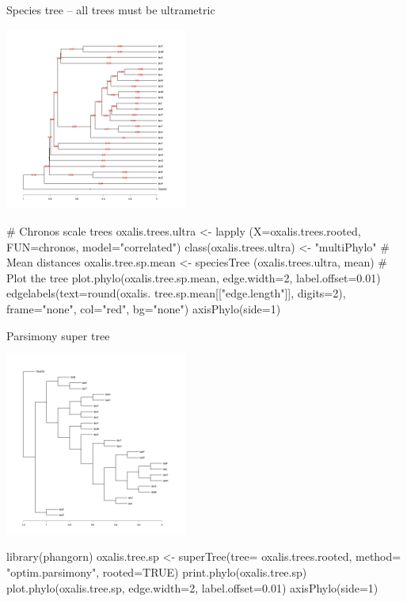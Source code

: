 \documentclass[compress, ucs, xelatex, 11pt, xcolor=svgnames,
  hyperref={
    bookmarks=true,
    unicode=true,
    colorlinks=true,
    pdftitle={Molecular data in R},
    plainpages=false,
    pdfauthor={Vojtech Zeisek},
    pdfsubject={Course about phylogeny and evolution in R},
    pdfcreator={XeLaTeX},
    pdfkeywords={R, evolution, phylogeny, molecular data},
    linkcolor=Tomato,
    anchorcolor=SaddleBrown,
    citecolor=Goldenrod,
    filecolor=DarkMagenta,
    menucolor=Sienna,
    urlcolor=DarkTurquoise,
    pdftex},
  url={hyphens, lowtilde} %
  ]{beamer}
\begin{document}
\begin{frame}[fragile]{Species tree -- all trees must be ultrametric}
\begin{multicols}{2}
\includegraphics[height=6cm]{oxalis-sp.png}
  \columnbreak
  \begin{spluscode}
    # Chronos scale trees
    oxalis.trees.ultra <- lapply
      (X=oxalis.trees.rooted,
      FUN=chronos, model="correlated")
    class(oxalis.trees.ultra) <-
      "multiPhylo"
    # Mean distances
    oxalis.tree.sp.mean <- speciesTree
      (oxalis.trees.ultra, mean)
    # Plot the tree
    plot.phylo(oxalis.tree.sp.mean,
      edge.width=2, label.offset=0.01)
    edgelabels(text=round(oxalis.
      tree.sp.mean[["edge.length"]],
      digits=2), frame="none",
      col="red", bg="none")
    axisPhylo(side=1)
  \end{spluscode}
\end{multicols}
\end{frame}

\begin{frame}[fragile]{Parsimony super tree}
\begin{multicols}{2}
  \includegraphics[height=6cm]{oxalis-pars.png}
  \begin{spluscode}
    library(phangorn)
    oxalis.tree.sp <- superTree(tree=
      oxalis.trees.rooted, method=
      "optim.parsimony", rooted=TRUE)
    print.phylo(oxalis.tree.sp)
    plot.phylo(oxalis.tree.sp,
      edge.width=2, label.offset=0.01)
    axisPhylo(side=1)
  \end{spluscode}
\end{multicols}
\end{frame}
\end{document}
